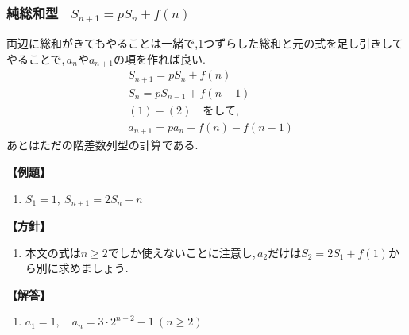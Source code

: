 \subsubsection{純総和型 \, $S_{n+1}=pS_n+f(n) $}
両辺に総和がきてもやることは一緒で,1つずらした総和と元の式を足し引きしてやることで,\,$a_n$や$a_{n+1}$の項を作れば良い.
\begin{align*}
   & S_{n+1}=pS_n+f(n) \tag{1}     \\
   & S_{n}=pS_{n-1}+f(n-1) \tag{2} \\
  & (1)-(2) \quad \text{をして,}          \\
   & a_{n+1}=pa_{n}+f(n)-f(n-1)
\end{align*}
あとはただの階差数列型の計算である.

\noindent \textbf{【例題】}
\begin{enumerate}[label=(\arabic*),parsep=3pt]
  \item $\displaystyle S_1=1,\ S_{n+1}=2S_n+n$
\end{enumerate}

\noindent\textbf{【方針】}
\begin{enumerate}[label=(\arabic*),parsep=3pt]
  \item 本文の式は$n\ge2$でしか使えないことに注意し,\,$a_2$だけは$S_2=2S_1+f(1)$から別に求めましょう.
\end{enumerate}

\noindent\textbf{【解答】}
\begin{enumerate}[label=(\arabic*),parsep=3pt]
  \item $\displaystyle a_1=1,\quad a_n=3\cdot2^{n-2}-1\ (n\ge2)$
\end{enumerate}

